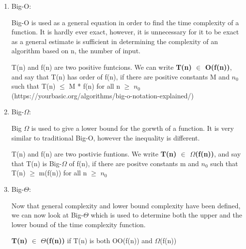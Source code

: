 \documentclass{article}
\begin{document}
\begin{enumerate}
    \item Big-O: \\
    
            \smallskip

            Big-O is used as a general equation in order to find the time complexity of a function.
            It is hardly ever exact, however, it is unnecessary for it to be exact as a general
            estimate is sufficient in determining the complexity of an algorithm based on n, the
            number of input.

            T(n) and f(n) are two positive funtcions. We can write \textbf{T(n) $\in$ O(f(n))},
            and say that T(n) has order of f(n), if there are positive constants M and $n_0$ 
            such that T(n) $\leq$ M * f(n) for all n $\geq$ $n_0$ \\

            (https://yourbasic.org/algorithms/big-o-notation-explained/)
            
            \smallskip

    \item Big-$\Omega$: \\
    
            \smallskip

            Big $\Omega$ is used to give a lower bound for the gorwth of a function.
            It is very similar to traditional Big-O, however the inequality is different.

            T(n) and f(n) are two postivie funtions. We write \textbf{T(n) $\in$ $\Omega$(f(n))},
            and say that T(n) is Big-$\Omega$ of f(n), if there are positve constants m and $n_0$
            such that T(n) $\geq$ m(f(n)) for all n $\geq$ $n_0$


            \smallskip

    \item Big-$\Theta$: \\
    
            \smallskip

            Now that general complexity and lower bound complexity have been defined, we can now look
            at Big-$\Theta$ which is used to determine both the upper and the lower bound of the 
            time complexity function.

            \textbf{T(n) $\in$ $\Theta$(f(n))} if T(n) is both OO(f(n)) and $\Omega$(f(n))

            \smallskip

\end{enumerate}
\end{document}
